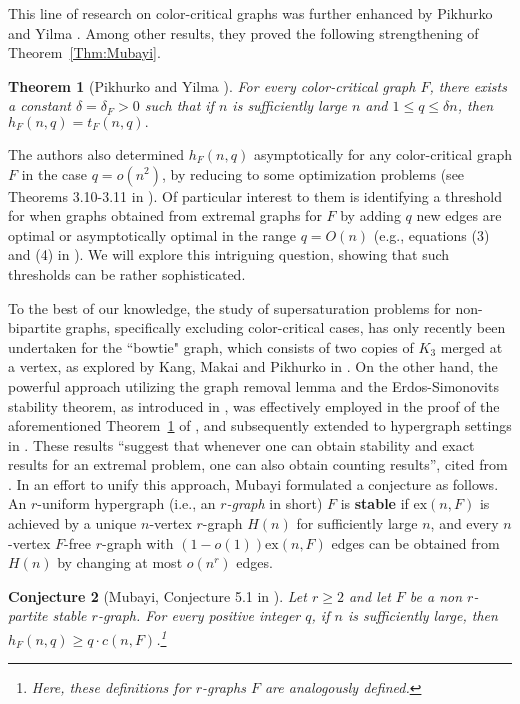 \documentclass[10pt]{article}
\newtheorem{theorem}{Theorem}[section]
\newtheorem{conjecture}[theorem]{Conjecture}
\def\ex{\mathrm{ex}}
\begin{document}
This line of research on color-critical graphs was further enhanced by Pikhurko and Yilma \cite{pikhurko2017}.
Among other results, they proved the following strengthening of Theorem~\ref{Thm:Mubayi}.
\begin{theorem}[Pikhurko and Yilma \cite{pikhurko2017}]\label{Thm:PY}
For every color-critical graph $F$, there exists a constant $\delta=\delta_F>0$ such that if $n$ is sufficiently large $n$ and $1\leq q\leq \delta n$, then $h_F(n,q)=t_F(n,q).$
\end{theorem}
The authors \cite{pikhurko2017} also determined $h_F(n,q)$ asymptotically for any color-critical graph $F$ in the case $q=o(n^2)$,
by reducing to some optimization problems (see Theorems 3.10-3.11 in \cite{pikhurko2017}).
Of particular interest to them is identifying a threshold for when graphs obtained from extremal graphs for $F$ by adding $q$ new edges
are optimal or asymptotically optimal in the range $q=O(n)$ (e.g., equations (3) and (4) in \cite{pikhurko2017}).
We will explore this intriguing question, showing that such thresholds can be rather sophisticated.


To the best of our knowledge, the study of supersaturation problems for non-bipartite graphs, specifically excluding color-critical cases, has only recently been undertaken for the ``bowtie" graph,
which consists of two copies of $K_3$ merged at a vertex, as explored by Kang, Makai and Pikhurko in \cite{Kang2017}.
On the other hand, the powerful approach utilizing the graph removal lemma and the Erdos-Simonovits stability theorem, as introduced in \cite{mubayi2010}, was effectively employed in the proof of the aforementioned Theorem~\ref{Thm:PY} of \cite{pikhurko2017}, and subsequently extended to hypergraph settings in \cite{mubayi2013, mubayi2013-2}.
These results ``suggest that whenever one can obtain stability and exact results for an extremal problem, one can also obtain counting results'', cited from \cite{mubayi2013}.
In an effort to unify this approach, Mubayi \cite{mubayi2013} formulated a conjecture as follows.
An $r$-uniform hypergraph (i.e., an {\it $r$-graph} in short) $F$ is {\bf stable} if $\ex(n,F)$ is achieved by a unique $n$-vertex $r$-graph $H(n)$ for sufficiently large $n$, and every $n$-vertex $F$-free $r$-graph with $(1-o(1))\ex(n,F)$ edges can be obtained from $H(n)$ by changing at most $o(n^r)$ edges.

\begin{conjecture}[Mubayi, Conjecture 5.1 in \cite{mubayi2013}]\label{con-mubayi}
Let $r\geq 2$ and let $F$ be a non $r$-partite stable $r$-graph.
For every positive integer $q$, if $n$ is sufficiently large, then
$h_F(n,q)\geq q\cdot c(n,F)$.\footnote{Here, these definitions for $r$-graphs $F$ are analogously defined.}
\end{conjecture}
\end{document}
